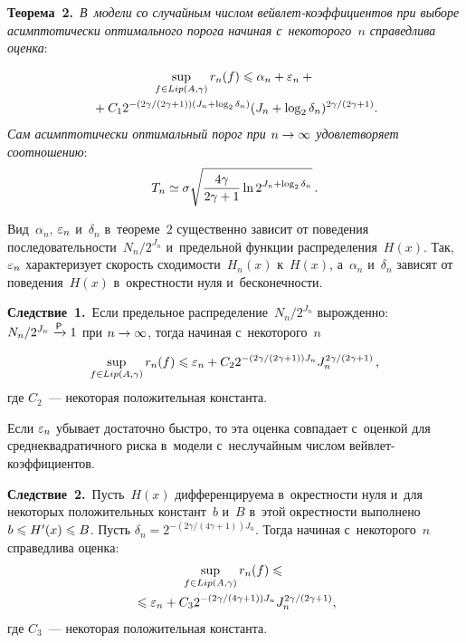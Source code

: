 \begin{multicols}{2}
\smallskip


\noindent
\textbf{Теорема~2.}\ \textit{В~модели со случайным чис\-лом вейв\-лет-ко\-эф\-фи\-ци\-ен\-тов 
при выборе асимптотически оптимального порога начиная с~некоторого~$n$ 
справедлива оценка}:

\noindent
\begin{multline*}
\sup_{f\in Lip(A,\gamma)}{r_n(f)}\leqslant 
\alpha_n+\varepsilon_n+{}\\
{}+C_1 2^{-({2\gamma}/({2\gamma+1}))
(J_n+\log_2\delta_n)}(J_n+\log_2\delta_n)^{{2\gamma}/({2\gamma+1})}.
\end{multline*}
\textit{Сам асимптотически оптимальный порог при $n\hm\to\infty$ 
удовлетворяет соотношению}:
$$
T_n\simeq\sigma\sqrt{\displaystyle\frac{\displaystyle 4\gamma\mathstrut}{\displaystyle 2\gamma+1\mathstrut}\ln 2^{J_n+\log_2\delta_n}}\,.
$$

{Вид~$\alpha_n$, $\varepsilon_n$ и~$\delta_n$ в~тео\-ре\-ме~$2$ существенно зависит от поведения 
по\-сле\-до\-ва\-тель\-ности~$N_n/2^{J_n}$ и~предельной функции распределения~$H(x)$. 
Так, $\varepsilon_n$ характеризует ско\-рость сходимости~$H_n(x)$ к~$H(x)$, 
а~$\alpha_n$ и~$\delta_n$ зависят от поведения~$H(x)$ в~окрест\-ности 
нуля и~бес\-ко\-неч\-ности}.

\smallskip

\noindent
\textbf{Следствие~1.}\ Если предельное распределение~$N_n/2^{J_n}$ вы\-рож\-ден\-но: 
$N_n/2^{J_n}\xrightarrow{{\sf P}}1$ при $n\hm\to\infty$, тогда начиная с~некоторого~$n$

\noindent
\begin{equation*}
\sup_{f\in Lip(A,\gamma)}{r_n(f)}
\leqslant \varepsilon_n+C_2 2^{-({2\gamma}/({2\gamma+1}))J_n}
J_n^{{2\gamma}/({2\gamma+1})}\,,
\end{equation*}
где $C_2$~--- некоторая положительная константа.

Если $\varepsilon_n$ убывает достаточно быст\-ро, то эта оценка сов\-па\-да\-ет с~оценкой 
для сред\-не\-квад\-ра\-тич\-но\-го рис\-ка в~модели с~неслучайным чис\-лом 
вейв\-лет-ко\-эф\-фи\-ци\-ен\-тов.

\smallskip

\noindent
\textbf{Следствие~2.}\ Пусть~$H(x)$ дифференцируема в~окрест\-ности нуля и~для 
некоторых положительных констант~$b$ и~$B$ в~этой окрест\-ности 
выполнено $b\hm\leqslant H'(x)\hm\leqslant B$. Пусть
$\delta_n=2^{-({2\gamma}/({4\gamma+1}))J_n}.$ Тогда  начиная с~некоторого~$n$ 
справедлива оценка:
\begin{multline}
\label{hard_col1}
\sup_{f\in Lip(A,\gamma)} r_n(f)\leqslant {}\\
{}\leqslant
\varepsilon_n+C_3 2^{-({2\gamma}/({4\gamma+1}))J_n}
J_n^{{2\gamma}/({2\gamma+1})},
\end{multline}
где $C_3$~--- некоторая положительная константа.


\end{multicols}
